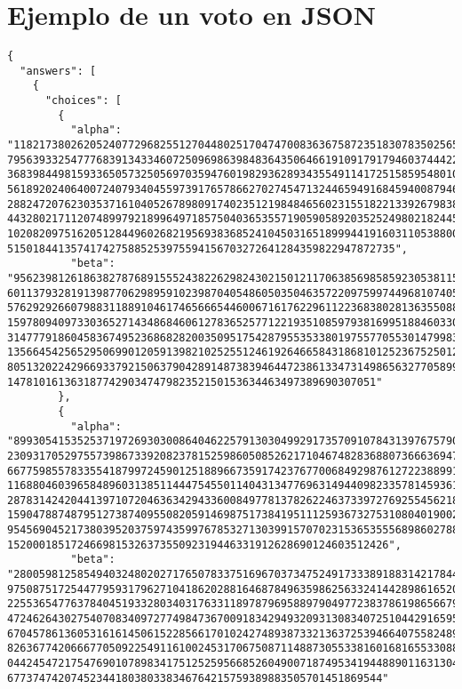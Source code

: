 \section{Ejemplo de un voto en JSON} \label{anexo:ejemploVotoJSON}


\begin{lstlisting}
{
  "answers": [
    {
      "choices": [
        {
          "alpha": "1182173802620524077296825512704480251704747008363675872351830783502565958108 79563933254777683913433460725096986398483643506466191091791794603744422363802234 36839844981593365057325056970359476019829362893435549114172515859548010845050316 56189202406400724079340455973917657866270274547132446594916845940087946766439914 28824720762303537161040526789809174023512198484656023155182213392679838148328690 44328021711207489979218996497185750403653557190590589203525249802182445788274397 10208209751620512844960268219569383685241045031651899944191603110538800514467824 5150184413574174275885253975594156703272641284359822947872735",
          "beta": "95623981261863827876891555243822629824302150121170638569858592305381156289005 60113793281913987706298959102398704054860503504635722097599744968107405574943928 57629292660798831188910461746566654460067161762296112236838028136355088189082014 15978094097330365271434868460612783652577122193510859793816995188460330824397880 31477791860458367495236868282003509517542879553533801975577055301479983488411988 13566454256529506990120591398210252551246192646658431868101252367525012654581050 80513202242966933792150637904289148738394644723861334731498656327705899476063957 1478101613631877429034747982352150153634463497389690307051"
        },
        {
          "alpha": "8993054153525371972693030086404622579130304992917357091078431397675790112518 23093170529755739867339208237815259860508526217104674828368807366636947794528871 66775985578335541879972459012518896673591742376770068492987612722388991735178073 11688046039658489603138511444754550114043134776963149440982335781459361519918758 28783142420441397107204636342943360084977813782622463733972769255456218854227752 15904788748795127387409550820591469875173841951112593673275310804019002116955783 95456904521738039520375974359976785327130399157070231536535556898602788483521439 152000185172466981532637355092319446331912628690124603512426",
          "beta": "28005981258549403248020271765078337516967037347524917333891883142178449343455 97508751725447795931796271041862028816468784963598625633241442898616520057117558 22553654776378404519332803403176331189787969588979049772383786198656679222398908 47246264302754070834097277498473670091834294932093130834072510442916595976424867 67045786136053161614506152285661701024274893873321363725394664075582489167665954 82636774206667705092254911610024531706750871148873055338160168165533088391207051 04424547217547690107898341751252595668526049007187495341944889011631304576334522 67737474207452344180380338346764215759389883505701451869544"

\end{lstlisting}
